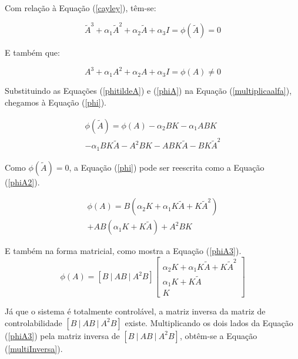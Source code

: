 \documentclass[journal,brazil,english]{IEEEtran}
\begin{document}
Com relação à Equação (\ref{cayley}), têm-se:

\begin{equation}\label{phitildeA}
\tilde{A}^3 + \alpha _1 \tilde{A}^2 + \alpha _2 \tilde{A} +\alpha _3I = \phi(\tilde{A}) = 0
\end{equation}

E também que:

\begin{equation}\label{phiA}
A^3 + \alpha _1 A^2 + \alpha _2 A +\alpha _3I = \phi(A) \neq 0
\end{equation}

Substituindo as Equações (\ref{phitildeA}) e (\ref{phiA}) na Equação (\ref{multiplicaalfa}), chegamos à Equação (\ref{phi}).

\begin{equation}\label{phi}
\begin{matrix}
\phi(\tilde{A})=\phi(A) - \alpha _2BK - \alpha _1ABK \\ - \alpha _1BK\tilde{A} - A^2BK - ABK\tilde{A} - BK\tilde{A}^2
\end{matrix}
\end{equation}

Como $\phi(\tilde{A})=0$, a Equação (\ref{phi}) pode ser reescrita como a Equação (\ref{phiA2}).

\begin{equation}\label{phiA2}
\begin{matrix}
\phi(A)=B(\alpha _2K + \alpha _1K\tilde{A} + K\tilde{A}^2) \\+ AB(\alpha _1K + K\tilde{A}) + A^2BK
\end{matrix}
\end{equation}

E também na forma matricial, como mostra a Equação (\ref{phiA3}).
\begin{equation}\label{phiA3}
\phi(A) = \left[B~|~AB~|~A^2B\right]
\begin{bmatrix}
 \alpha _2K + \alpha _1K\tilde{A} + K\tilde{A}^2 \\ 
 \alpha _1K + K\tilde{A} \\
 K
\end{bmatrix}
\end{equation}

Já que o sistema é totalmente controlável, a matriz inversa da matriz de controlabilidade $\left[B~|~AB~|~A^2B\right]$ existe. Multiplicando os dois lados da Equação (\ref{phiA3}) pela matriz inversa de $\left[B~|~AB~|~A^2B\right]$, obtêm-se a Equação (\ref{multiInversa}).
\end{document}
